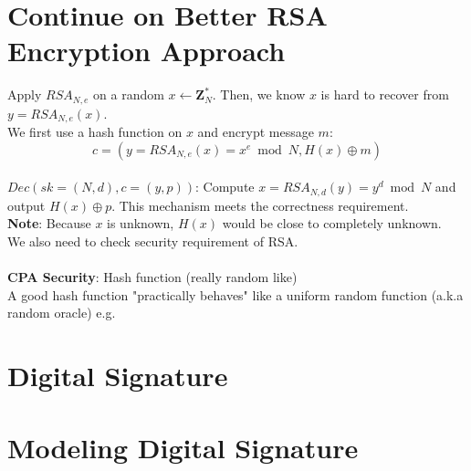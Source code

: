 \documentclass{scribe}
\begin{document}
\maketitle


\section{Continue on Better RSA Encryption Approach}
Apply $RSA_{N,e}$ on a random $x \leftarrow \mathbf{Z}_N^*$. Then, we know $x$ is hard to recover from $y=RSA_{N,e}(x)$.
\\
We first use a hash function on $x$ and encrypt message $m$:
\[c = (y=RSA_{N,e}(x) = x^e \bmod N, H(x) \oplus m)\]  
\\
$Dec(sk=(N,d), c=(y,p))$: Compute $x=RSA_{N,d}(y) = y ^d \bmod N$ and output $H(x) \oplus p$. This mechanism meets the correctness requirement.
\\
\textbf{Note}: Because $x$ is unknown, $H(x)$ would be close to completely unknown.
\vspace{8mm}
\\
We also need to check security requirement of RSA.
\\\\
\textbf{CPA Security}: Hash function (really random like)
\\
A good hash function "practically behaves" like a uniform random function (a.k.a random oracle) e.g.

\vspace{10mm}
\section{Digital Signature}

\vspace{10mm}
\section{Modeling Digital Signature}

\vspace{10mm}
\end{document}
